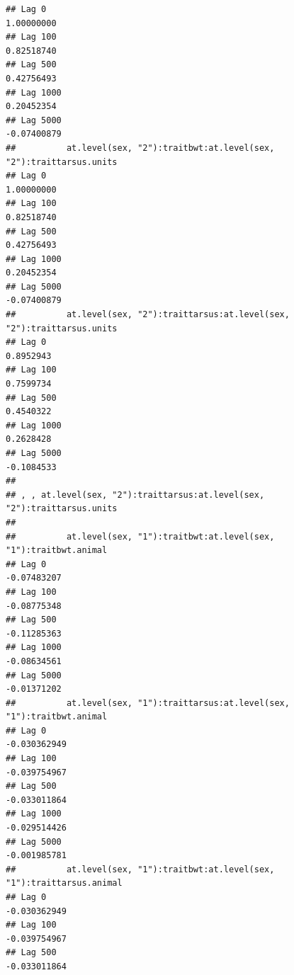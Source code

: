 \documentclass[
  12pt,
]{book}
\begin{document}
\begin{verbatim}
## Lag 0                                                          1.00000000
## Lag 100                                                        0.82518740
## Lag 500                                                        0.42756493
## Lag 1000                                                       0.20452354
## Lag 5000                                                      -0.07400879
##          at.level(sex, "2"):traitbwt:at.level(sex, "2"):traittarsus.units
## Lag 0                                                          1.00000000
## Lag 100                                                        0.82518740
## Lag 500                                                        0.42756493
## Lag 1000                                                       0.20452354
## Lag 5000                                                      -0.07400879
##          at.level(sex, "2"):traittarsus:at.level(sex, "2"):traittarsus.units
## Lag 0                                                              0.8952943
## Lag 100                                                            0.7599734
## Lag 500                                                            0.4540322
## Lag 1000                                                           0.2628428
## Lag 5000                                                          -0.1084533
## 
## , , at.level(sex, "2"):traittarsus:at.level(sex, "2"):traittarsus.units
## 
##          at.level(sex, "1"):traitbwt:at.level(sex, "1"):traitbwt.animal
## Lag 0                                                       -0.07483207
## Lag 100                                                     -0.08775348
## Lag 500                                                     -0.11285363
## Lag 1000                                                    -0.08634561
## Lag 5000                                                    -0.01371202
##          at.level(sex, "1"):traittarsus:at.level(sex, "1"):traitbwt.animal
## Lag 0                                                         -0.030362949
## Lag 100                                                       -0.039754967
## Lag 500                                                       -0.033011864
## Lag 1000                                                      -0.029514426
## Lag 5000                                                      -0.001985781
##          at.level(sex, "1"):traitbwt:at.level(sex, "1"):traittarsus.animal
## Lag 0                                                         -0.030362949
## Lag 100                                                       -0.039754967
## Lag 500                                                       -0.033011864

\end{verbatim}
\end{document}
